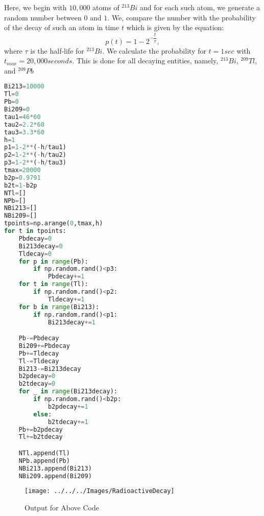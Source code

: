 \begin{center}


\end{center}
Here, we begin with $10,000$ atoms of $^{213}Bi$ and for each such atom, we generate a random number between $0$ and $1$. We, compare the number with the probability of the decay of such an atom in time $t$ which is given by the equation:
$$p(t)=1-2^{-\dfrac{t}{\tau}},
$$
where $\tau$ is the half-life for $^{213}Bi$. We calculate the probability for $t=1 sec$ with $t_{max}=20,000 seconds$. This is done for all decaying entities, namely, $^{213}Bi$, $^{209}Tl$,  and  $^{209}Pb$
\begin{lstlisting}[language=Python, caption=Decay Chain, frame=single, label={lst:decay} ]
Bi213=10000
Tl=0
Pb=0
Bi209=0
tau1=46*60
tau2=2.2*60
tau3=3.3*60
h=1
p1=1-2**(-h/tau1)
p2=1-2**(-h/tau2)
p3=1-2**(-h/tau3)
tmax=20000
b2p=0.9791
b2t=1-b2p
NTl=[]
NPb=[]
NBi213=[]
NBi209=[]
tpoints=np.arange(0,tmax,h)
for t in tpoints:
	Pbdecay=0
	Bi213decay=0
	Tldecay=0
	for p in range(Pb):
		if np.random.rand()<p3:
			Pbdecay+=1
	for t in range(Tl):
		if np.random.rand()<p2:
			Tldecay+=1
	for b in range(Bi213):
		if np.random.rand()<p1:
			Bi213decay+=1

	Pb-=Pbdecay
	Bi209+=Pbdecay
	Pb+=Tldecay
	Tl-=Tldecay
	Bi213-=Bi213decay
	b2pdecay=0
	b2tdecay=0
	for _ in range(Bi213decay):
		if np.random.rand()<b2p:
			b2pdecay+=1
		else:
			b2tdecay+=1
	Pb+=b2pdecay
	Tl+=b2tdecay

	NTl.append(Tl)
	NPb.append(Pb)
	NBi213.append(Bi213)
	NBi209.append(Bi209)


\end{lstlisting}
\begin{figure}[H]
	\centering
	\texttt{[image: ../../../Images/RadioactiveDecay]}
	\caption{Output for Above Code}
	\label{fig:radioactivedecay}
\end{figure}

